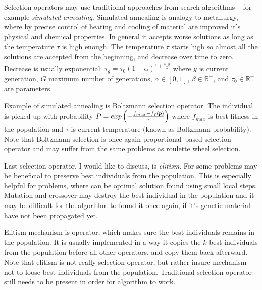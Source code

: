 Selection operators may use traditional approaches from search algorithms -- for example \emph{simulated annealing}. Simulated annealing is analogy to metallurgy, where by precise control of heating and cooling of material are improved it's physical and chemical properties. In general it accepts worse solutions as long as the temperature $\tau$ is high enough. The temperature $\tau$ starts high so almost all the solutions are accepted from the beginning, and decrease over time to zero. Decrease is usually exponential: $\tau_g=\tau_0(1-\alpha)^{1+\frac{\beta\cdot g}{G}}$ where $g$ is current generation, $G$ maximum number of generations, $\alpha\in\left[0,1\right]$, $\beta\in\mathbb{R}^+$, and $\tau_0\in\mathbb{R}^+$ are parameters. 

Example of simulated annealing is Boltzmann selection operator. The individual is picked up with probability 
$P=exp\left(-\frac{f_{max} - f_f(\pmb{p})}{\tau}\right)$
where $f_{max}$ is best fitness in the population and $\tau$ is current temperature (known as Boltzmann probability). Note that Boltzmann selection is once again proportional--based selection operator and may suffer from the same problems as roulette wheel selection.

Last selection operator, I would like to discuss, is \emph{elitism}. For some problems may be beneficial to preserve best individuals from the population. This is especially helpful for problems, where can be optimal solution found using small local steps. Mutation and crossover may destroy the best individual in the population and it may be difficult for the algorithm to found it once again, if it's genetic material have not been propagated yet. 

Elitism mechanism is operator, which makes sure the best individuals remains in the population. It is usually implemented in a way it copies the $k$ best individuals from the population before all other operators, and copy them back afterward. Note that elitism is not really selection operator, but rather insure mechanism not to loose best individuals from the population. Traditional selection operator still needs to be present in order for algorithm to work. 




